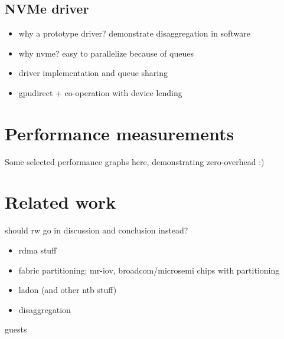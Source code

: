\subsection{NVMe driver}\label{sec:nvme}
\begin{itemize}
    \item why a prototype driver? demonstrate disaggregation in software
    \item why nvme? easy to parallelize because of queues
    \item driver implementation and queue sharing
    \item gpudirect + co-operation with device lending
\end{itemize}


\section{Performance measurements}\label{sec:eval}
Some selected performance graphs here, demonstrating zero-overhead :)

\section{Related work}\label{sec:rw}
should rw go in discussion and conclusion instead?
\begin{itemize}
    \item rdma stuff
    \item fabric partitioning: mr-iov, broadcom/microsemi chips with partitioning
    \item ladon (and other ntb stuff)
    \item disaggregation
\end{itemize}

\glspl{guest}

%
%
%
%
%
%




